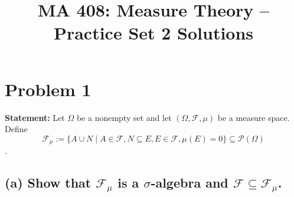 \documentclass[12pt]{article}
\title{MA 408: Measure Theory -- Practice Set 2 Solutions}
\author{}
\date{}
\begin{document}
\maketitle

\section*{Problem 1}

\textbf{Statement:} Let $\Omega$ be a nonempty set and let $(\Omega, \mathcal{F}, \mu)$ be a measure space. Define 
$$ \mathcal{F}_{\mu} := \{A \cup N \mid A \in \mathcal{F}, N \subseteq E, E \in \mathcal{F}, \mu(E) = 0\} \subseteq \mathcal{P}(\Omega) $$.

\subsection*{(a) Show that $\mathcal{F}_{\mu}$ is a $\sigma$-algebra and $\mathcal{F} \subseteq \mathcal{F}_{\mu}$.}
\end{document}
